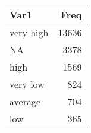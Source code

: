 
\begin{tabular}[t]{lr}
\toprule
Var1 & Freq\\
\midrule
very high & 13636\\
NA & 3378\\
high & 1569\\
very low & 824\\
average & 704\\
\addlinespace
low & 365\\
\bottomrule
\end{tabular}